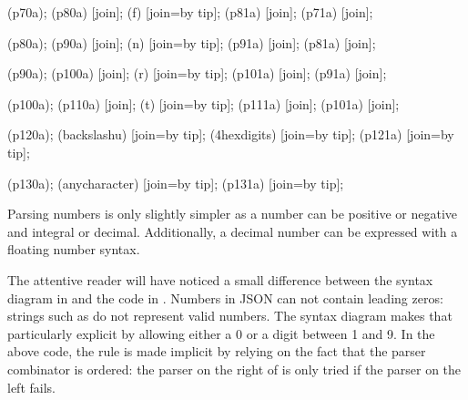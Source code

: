 \documentclass[a4paper,10pt,twoside]{book}
\begin{document}
{{    \chainin (p70a);
    \chainin (p80a) [join];
    \chainin (f) [join=by tip];
    \chainin (p81a) [join];
    \chainin (p71a) [join];

    \chainin (p80a);
    \chainin (p90a) [join];
    \chainin (n) [join=by tip];
    \chainin (p91a) [join];
    \chainin (p81a) [join];

    \chainin (p90a);
    \chainin (p100a) [join];
    \chainin (r) [join=by tip];
    \chainin (p101a) [join];
    \chainin (p91a) [join];

    \chainin (p100a);
    \chainin (p110a) [join];
    \chainin (t) [join=by tip];
    \chainin (p111a) [join];
    \chainin (p101a) [join];

    \chainin (p120a);
    \chainin (backslashu) [join=by tip];
    \chainin (4hexdigits) [join=by tip];
    \chainin (p121a) [join=by tip];

    \chainin (p130a);
    \chainin (anycharacter) [join=by tip];
    \chainin (p131a) [join=by tip];
  }
}

Parsing numbers is only slightly simpler as a number can be positive
or negative and integral or decimal. Additionally, a decimal number
can be expressed with a floating number syntax.


The attentive reader will have noticed a small difference between the
syntax diagram in  and the code in
. Numbers in JSON can not contain leading zeros:
\ie{} strings such as  do not represent valid numbers. The
syntax diagram makes that particularly explicit by allowing either a 0
or a digit between 1 and 9. In the above code, the rule is made
implicit by relying on the fact that the parser combinator \ct{$/} is
ordered: the parser on the right of \ct{$/} is only tried if the
parser on the left fails.
\end{document}
